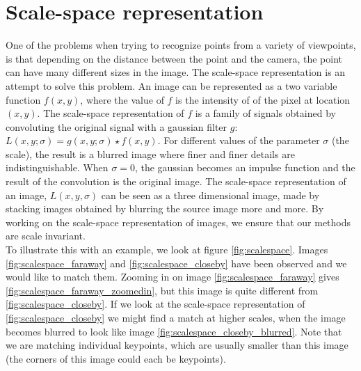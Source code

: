 \section{Scale-space representation}
One of the problems when trying to recognize points from a variety of viewpoints, is that depending on the distance between the point and the camera, the point can have many different sizes in the image. The scale-space representation is an attempt to solve this problem. An image can be represented as a two variable function $f(x,y)$, where the value of $f$ is the intensity of of the pixel at location $(x,y)$. The scale-space representation of $f$ is a family of signals obtained by convoluting the original signal with a gaussian filter $g$: $L(x,y;\sigma) = g(x,y;\sigma) \star f(x,y)$. For different values of the parameter $\sigma$ (the scale), the result is a blurred image where finer and finer details are indistinguishable. When $\sigma=0$, the gaussian becomes an impulse function and the result of the convolution is the original image. The scale-space representation of an image, $L(x,y,\sigma)$ can be seen as a three dimensional image, made by stacking images obtained by blurring the source image more and more. By working on the scale-space representation of images, we ensure that our methods are scale invariant. \cite{scalespace}\\
To illustrate this with an example, we look at figure \ref{fig:scalespace}. Images \ref{fig:scalespace_faraway} and \ref{fig:scalespace_closeby} have been observed and we would like to match them. Zooming in on image \ref{fig:scalespace_faraway} gives \ref{fig:scalespace_faraway_zoomedin}, but this image is quite different from \ref{fig:scalespace_closeby}. If we look at the scale-space representation of \ref{fig:scalespace_closeby} we might find a match at higher scales, when the image becomes blurred to look like image \ref{fig:scalespace_closeby_blurred}. Note that we are matching individual keypoints, which are usually smaller than this image (the corners of this image could each be keypoints).

